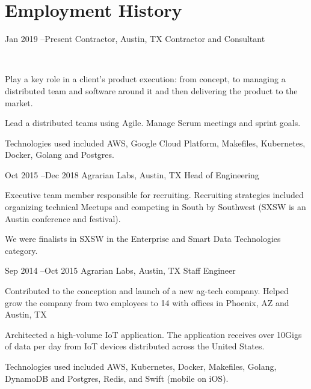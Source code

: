 \documentclass[10pt]{article} %
\begin{document}

\section{Employment History}

\job
{Jan 2019 --}{Present}
{Contractor, Austin, TX}
{}
{Contractor and Consultant}
{\\

\begin{itemize-noindent}
\item{Play a key role in a client's product execution: from concept, to managing a distributed team and software around it and then delivering the product to the market.}
\item{Lead a distributed teams using Agile. Manage Scrum meetings and sprint goals.}
\item{Technologies used included AWS, Google Cloud Platform, Makefiles, Kubernetes, Docker, Golang and Postgres.}
\end{itemize-noindent}
}


\job
{Oct 2015 --}{Dec 2018}
{Agrarian Labs, Austin, TX}
{}
{Head of Engineering}
{

\begin{itemize-noindent}
\item{Executive team member responsible for recruiting. Recruiting strategies included organizing technical Meetups and competing in South by Southwest (SXSW is an Austin conference and festival).}
\item{We were finalists in SXSW in the Enterprise and Smart Data Technologies category.}
\end{itemize-noindent}
}



\job
{Sep 2014 --}{Oct 2015}
{Agrarian Labs, Austin, TX}
{}
{Staff Engineer}
{

\begin{itemize-noindent}
\item{Contributed to the conception and launch of a new ag-tech company.  Helped grow the company from two employees to 14 with offices in Phoenix, AZ and Austin, TX}
\item{Architected a high-volume IoT application.  The application receives over 10Gigs of data per day from IoT devices distributed across the United States.}
\item{Technologies used included AWS, Kubernetes, Docker, Makefiles, Golang, DynamoDB and Postgres, Redis, and Swift (mobile on iOS).}
\end{itemize-noindent}
}
\end{document}
